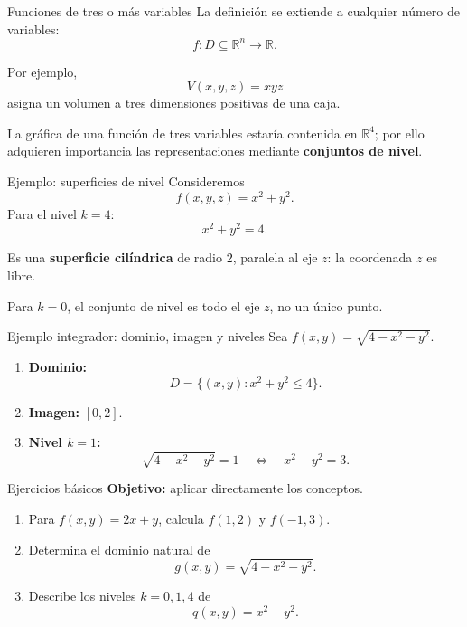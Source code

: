 \documentclass[main.tex]{subfiles}
\begin{document}
\begin{frame}{Funciones de tres o más variables}
La definición se extiende a cualquier número de variables:
\[
f:D\subseteq\mathbb R^n\longrightarrow\mathbb R.
\]
\medskip

Por ejemplo,
\[
V(x,y,z)=xyz
\]
asigna un volumen a tres dimensiones positivas de una caja.
\medskip

La gráfica de una función de tres variables estaría contenida en $\mathbb R^4$; por ello adquieren importancia las representaciones mediante \textbf{conjuntos de nivel}.
\end{frame}

\begin{frame}{Ejemplo: superficies de nivel}
Consideremos
\[
f(x,y,z)=x^2+y^2.
\]
Para el nivel $k=4$:
\[
x^2+y^2=4.
\]
\medskip

Es una \textbf{superficie cilíndrica} de radio $2$, paralela al eje $z$: la coordenada $z$ es libre.
\medskip

Para $k=0$, el conjunto de nivel es todo el eje $z$, no un único punto.
\end{frame}

\begin{frame}{Ejemplo integrador: dominio, imagen y niveles}
Sea $f(x,y)=\sqrt{4-x^2-y^2}$.
\begin{enumerate}
  \item \textbf{Dominio:}
  \[
  D=\{(x,y):x^2+y^2\leq4\}.
  \]
  \item \textbf{Imagen:} $[0,2]$.
  \item \textbf{Nivel $k=1$:}
  \[
  \sqrt{4-x^2-y^2}=1
  \quad\Longleftrightarrow\quad
  x^2+y^2=3.
  \]
\end{enumerate}
\end{frame}

\begin{frame}{Ejercicios básicos}
\textbf{Objetivo:} aplicar directamente los conceptos.
\medskip
\begin{enumerate}
  \item Para $f(x,y)=2x+y$, calcula $f(1,2)$ y $f(-1,3)$.
  \medskip
  \item Determina el dominio natural de
  \[
  g(x,y)=\sqrt{4-x^2-y^2}.
  \]
  \item Describe los niveles $k=0,1,4$ de
  \[
  q(x,y)=x^2+y^2.
  \]
\end{enumerate}
\end{frame}
\end{document}
